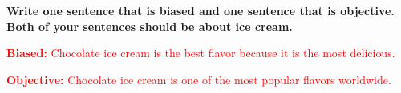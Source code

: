 \documentclass[12pt]{article}
\begin{document}
\vspace{2em}

\begin{tcolorbox}[colframe=black!60, colback=white, 
coltitle=black, colbacktitle=black!15, fonttitle=\bfseries\Large, 
title=Exit Ticket, halign title=center, left=10pt, right=10pt, top=5pt, bottom=15pt]
\textbf{Write one sentence that is biased and one sentence that is objective. Both of your sentences should be about ice cream.}

\textcolor{red}{\textbf{Biased:} Chocolate ice cream is the best flavor because it is the most delicious.}  

\textcolor{red}{\textbf{Objective:} Chocolate ice cream is one of the most popular flavors worldwide.}
\end{tcolorbox}
\end{document}
